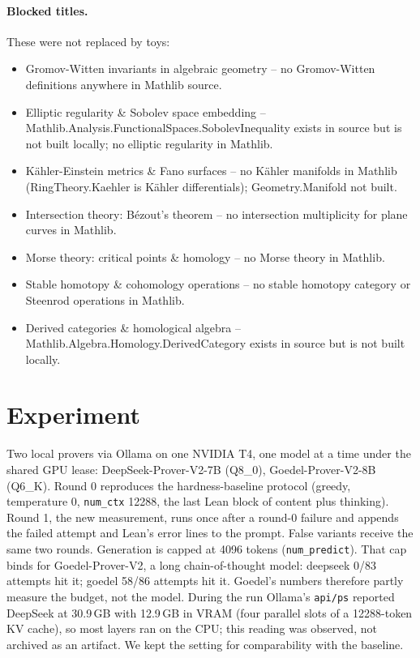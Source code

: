 \documentclass[11pt]{article}
\begin{document}
\paragraph{Blocked titles.} These were not replaced by toys:
\begin{itemize}
\item Gromov-Witten invariants in algebraic geometry -- no Gromov-Witten definitions anywhere in Mathlib source.
\item Elliptic regularity \& Sobolev space embedding -- Mathlib.Analysis.FunctionalSpaces.SobolevInequality exists in source but is not built locally; no elliptic regularity in Mathlib.
\item Kähler-Einstein metrics \& Fano surfaces -- no Kähler manifolds in Mathlib (RingTheory.Kaehler is Kähler differentials); Geometry.Manifold not built.
\item Intersection theory: Bézout's theorem -- no intersection multiplicity for plane curves in Mathlib.
\item Morse theory: critical points \& homology -- no Morse theory in Mathlib.
\item Stable homotopy \& cohomology operations -- no stable homotopy category or Steenrod operations in Mathlib.
\item Derived categories \& homological algebra -- Mathlib.Algebra.Homology.DerivedCategory exists in source but is not built locally.
\end{itemize}

\section{Experiment}
Two local provers via Ollama on one NVIDIA T4, one model at a time under the shared GPU lease: DeepSeek-Prover-V2-7B (Q8\_0), Goedel-Prover-V2-8B (Q6\_K). Round 0 reproduces the hardness-baseline protocol (greedy, temperature 0, \texttt{num\_ctx} 12288, the last Lean block of content plus thinking). Round 1, the new measurement, runs once after a round-0 failure and appends the failed attempt and Lean's error lines to the prompt. False variants receive the same two rounds. Generation is capped at 4096 tokens (\texttt{num\_predict}). That cap binds for Goedel-Prover-V2, a long chain-of-thought model: deepseek 0/83 attempts hit it; goedel 58/86 attempts hit it. Goedel's numbers therefore partly measure the budget, not the model. During the run Ollama's \texttt{api/ps} reported DeepSeek at 30.9\,GB with 12.9\,GB in VRAM (four parallel slots of a 12288-token KV cache), so most layers ran on the CPU; this reading was observed, not archived as an artifact. We kept the setting for comparability with the baseline.
\end{document}
